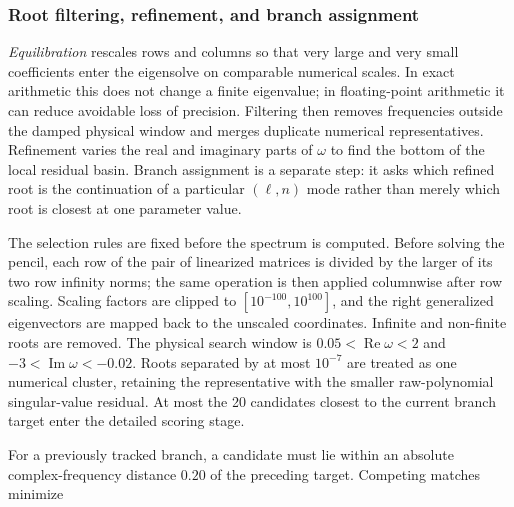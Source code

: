 \documentclass[12pt,a4paper]{article}
\begin{document}
\color{blue}
\subsubsection{Root filtering, refinement, and branch assignment}

\emph{Equilibration} rescales rows and columns so that very large and very
small coefficients enter the eigensolve on comparable numerical scales.  In
exact arithmetic this does not change a finite eigenvalue; in floating-point
arithmetic it can reduce avoidable loss of precision.  Filtering then removes
frequencies outside the damped physical window and merges duplicate numerical
representatives.  Refinement varies the real and imaginary parts of \(\omega\)
to find the bottom of the local residual basin.  Branch assignment is a
separate step: it asks which refined root is the continuation of a particular
\((\ell,n)\) mode rather than merely which root is closest at one parameter
value.

The selection rules are fixed before the spectrum is computed. Before solving
the pencil, each row of the pair of
linearized matrices is divided by the larger of its two row infinity norms;
the same operation is then applied columnwise after row scaling.  Scaling
factors are clipped to \([10^{-100},10^{100}]\), and the right generalized
eigenvectors are mapped back to the unscaled coordinates.  Infinite and
non-finite roots are removed.  The physical search window is
\(0.05<\operatorname{Re}\omega<2\) and
\(-3<\operatorname{Im}\omega<-0.02\).  Roots separated by at most
\(10^{-7}\) are treated as one numerical cluster, retaining the representative
with the smaller raw-polynomial singular-value residual.  At most the 20
candidates closest to the current branch target enter the detailed scoring stage.

For a previously tracked branch, a candidate must lie within an absolute
complex-frequency distance \(0.20\) of the preceding target.  Competing
matches minimize
\end{document}
